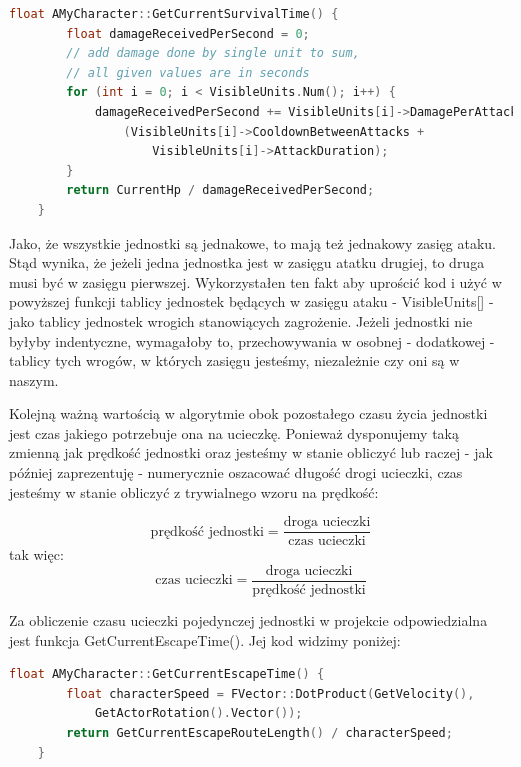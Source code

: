 \documentclass[12pt]{report}
\begin{document}
\begin{lstlisting}[language=C++, backgroundcolor=\color{black!5}, basicstyle=\footnotesize, caption=Funkcja GetCurrentSurvivalTime w klasie \texttt{AMyCharacter.cpp}.]
    float AMyCharacter::GetCurrentSurvivalTime() {
		float damageReceivedPerSecond = 0;
		// add damage done by single unit to sum, 
		// all given values are in seconds
		for (int i = 0; i < VisibleUnits.Num(); i++) { 
			damageReceivedPerSecond += VisibleUnits[i]->DamagePerAttack /
				(VisibleUnits[i]->CooldownBetweenAttacks + 
				    VisibleUnits[i]->AttackDuration);
		}
		return CurrentHp / damageReceivedPerSecond;
	}
\end{lstlisting}

Jako, że wszystkie jednostki są jednakowe, to mają też jednakowy zasięg ataku. Stąd wynika, że jeżeli jedna jednostka jest w zasięgu atatku drugiej, to druga musi być w zasięgu pierwszej. Wykorzystałen ten fakt aby uprościć kod i użyć w powyższej funkcji tablicy jednostek będących w zasięgu ataku - VisibleUnits[] - jako tablicy jednostek wrogich stanowiących zagrożenie. Jeżeli jednostki nie byłyby indentyczne, wymagałoby to, przechowywania w osobnej - dodatkowej - tablicy tych wrogów, w których zasięgu jesteśmy, niezależnie czy oni są w naszym.

Kolejną ważną wartością w algorytmie obok pozostałego czasu życia jednostki jest czas jakiego potrzebuje ona na ucieczkę. Ponieważ dysponujemy taką zmienną jak prędkość jednostki oraz jesteśmy w stanie obliczyć lub raczej - jak później zaprezentuję - numerycznie oszacować długość drogi ucieczki, czas jesteśmy w stanie obliczyć z trywialnego wzoru na prędkość:

\[ \text{prędkość jednostki} =  \dfrac{\text{droga ucieczki}}{\text{czas ucieczki}}  \]
tak więc:
\[ {\text{czas ucieczki}} =  \dfrac{\text{droga ucieczki}}{\text{prędkość jednostki}}  \]


Za obliczenie czasu ucieczki pojedynczej jednostki w projekcie odpowiedzialna jest funkcja GetCurrentEscapeTime(). Jej kod widzimy poniżej: 

\begin{lstlisting}[language=C++, backgroundcolor=\color{black!5}, basicstyle=\footnotesize, caption=Funkcja GetCurrentEscapeTime w klasie \texttt{AMyCharacter.cpp}.]
	float AMyCharacter::GetCurrentEscapeTime() {
		float characterSpeed = FVector::DotProduct(GetVelocity(), 
		    GetActorRotation().Vector());
		return GetCurrentEscapeRouteLength() / characterSpeed;
	}
\end{lstlisting}
\end{document}
